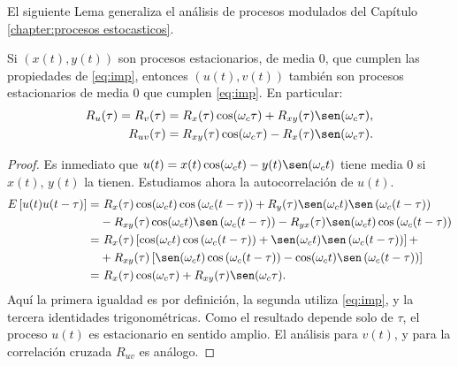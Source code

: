 El siguiente Lema generaliza el análisis de procesos modulados del Capítulo \ref{chapter:procesos estocasticos}.


\begin{lema}
    Si $\left(x(t),y(t)\right)$ son procesos estacionarios, de media 0, que cumplen las propiedades de \eqref{eq:imp},
    entonces $\left(u(t),v(t)\right)$ también  son
    procesos estacionarios de media 0 que cumplen  \eqref{eq:imp}. En particular:
    \begin{align*}
                R_u(\tau)=R_v(\tau)&=R_x(\tau)\cos(\omega_c\tau)+R_{xy}(\tau)\sen(\omega_c\tau),\\
                R_{uv}(\tau)&=R_{xy}(\tau)\cos(\omega_c\tau)-R_x(\tau)\sen(\omega_c\tau). %
              \end{align*}%

        \begin{proof} Es inmediato que
        $u(t)=x(t)\cos(\omega_ct)-y(t)\sen(\omega_ct)$ tiene media
        0 si $x(t)$, $y(t)$ la tienen. Estudiamos ahora la autocorrelación de
        $u(t)$.
            \begin{align*}
                E\left[u(t)u(t-\tau)\right]  = & \ R_x(\tau)\cos(\omega_ct)\cos\left(\omega_c(t-\tau)\right)
                                 + R_y(\tau)\sen(\omega_ct)\sen\left(\omega_c(t-\tau)\right) \\
                                & - R_{xy}(\tau)\cos(\omega_ct)\sen\left(\omega_c(t-\tau)\right)
                                  - R_{yx}(\tau)\sen(\omega_ct)\cos\left(\omega_c(t-\tau)\right)\\
                                 = & \ R_x(\tau)\left[\cos(\omega_ct)\cos\left(\omega_c(t-\tau)\right)+\sen(\omega_ct)\sen\left(\omega_c(t-\tau)\right)\right] +\\
                                & + R_{xy}(\tau)\left[\sen(\omega_ct)\cos\left(\omega_c(t-\tau)\right)
                                - \cos(\omega_ct)\sen\left(\omega_c(t-\tau)\right)\right]    \\
                                 = & \
                                 R_x(\tau)\cos(\omega_c\tau)+R_{xy}(\tau)\sen(\omega_c\tau).
            \end{align*}
            Aquí la primera igualdad es por definición, la segunda utiliza  \eqref{eq:imp}, y la
            tercera identidades trigonométricas. Como el resultado depende solo de $\tau$, el proceso $u(t)$ es
            estacionario en sentido amplio. El análisis para
            $v(t)$, y para la correlación cruzada $R_{uv}$ es
            análogo.
        \end{proof}
\end{lema}

